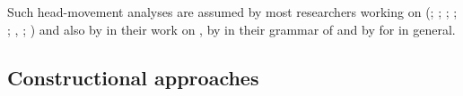 \documentclass[output=paper,biblatex,babelshorthands,newtxmath,draftmode,colorlinks,citecolor=brown]{langscibook}
\begin{document}
Such head-movement analyses are assumed by most
researchers working on  (\citealp*[Section~4.7]{KW91a}; \citealp{Oliva92a}; \citealp*{Netter92};   
\citealp*{Frank94}; \citealp*[Section~2.2.4.2]{Kiss95a}; \citealp[Section~3.1.1.1]{Feldhaus97},
\citealp[Section~5.1]{Meurers2000b}; \citealp{Mueller2005c,MuellerGS}) and also by \citet[,
  71]{BvN98a} in their work on , by \citet{MOeDanish} in their grammar of
 and by \citet{MuellerGermanic} for  in general.

\subsection{Constructional approaches}
\label{sec-aux-inversion-phrasal}

\end{document}
